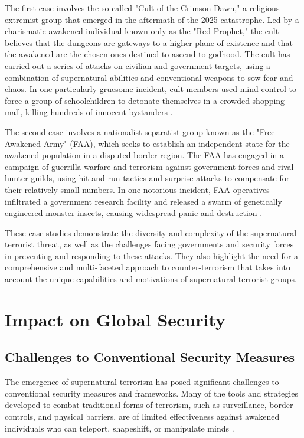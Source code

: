\documentclass[12pt, a4paper]{article}
\begin{document}
The first case involves the so-called "Cult of the Crimson Dawn," a religious extremist group that emerged in the aftermath of the 2025 catastrophe. Led by a charismatic awakened individual known only as the "Red Prophet," the cult believes that the dungeons are gateways to a higher plane of existence and that the awakened are the chosen ones destined to ascend to godhood. The cult has carried out a series of attacks on civilian and government targets, using a combination of supernatural abilities and conventional weapons to sow fear and chaos. In one particularly gruesome incident, cult members used mind control to force a group of schoolchildren to detonate themselves in a crowded shopping mall, killing hundreds of innocent bystanders \citep{Muller2027}.

The second case involves a nationalist separatist group known as the "Free Awakened Army" (FAA), which seeks to establish an independent state for the awakened population in a disputed border region. The FAA has engaged in a campaign of guerrilla warfare and terrorism against government forces and rival hunter guilds, using hit-and-run tactics and surprise attacks to compensate for their relatively small numbers. In one notorious incident, FAA operatives infiltrated a government research facility and released a swarm of genetically engineered monster insects, causing widespread panic and destruction \citep{Liu2026}.

These case studies demonstrate the diversity and complexity of the supernatural terrorist threat, as well as the challenges facing governments and security forces in preventing and responding to these attacks. They also highlight the need for a comprehensive and multi-faceted approach to counter-terrorism that takes into account the unique capabilities and motivations of supernatural terrorist groups.

\section{Impact on Global Security}
\subsection{Challenges to Conventional Security Measures}
The emergence of supernatural terrorism has posed significant challenges to conventional security measures and frameworks. Many of the tools and strategies developed to combat traditional forms of terrorism, such as surveillance, border controls, and physical barriers, are of limited effectiveness against awakened individuals who can teleport, shapeshift, or manipulate minds \citep{Nakamura2027}.
\end{document}
